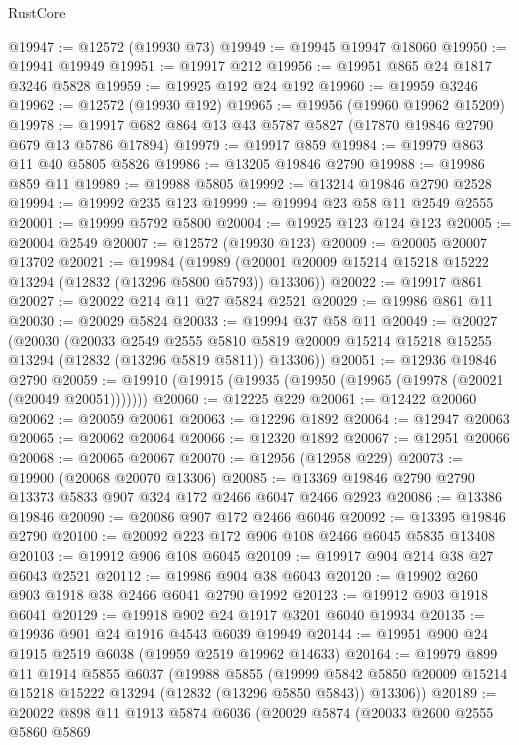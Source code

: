 \begin{lexlean}{RustCore}
\begin{coremodule}
@19947 := @12572 (@19930 @73)
@19949 := @19945 @19947 @18060
@19950 := @19941 @19949
@19951 := @19917 @212
@19956 := @19951 @865 @24 @1817 @3246 @5828
@19959 := @19925 @192 @24 @192
@19960 := @19959 @3246
@19962 := @12572 (@19930 @192)
@19965 := @19956 (@19960 @19962 @15209)
@19978 := @19917 @682 @864 @13 @43 @5787 @5827 (@17870 @19846 @2790 @679 @13 @5786 @17894)
@19979 := @19917 @859
@19984 := @19979 @863 @11 @40 @5805 @5826
@19986 := @13205 @19846 @2790
@19988 := @19986 @859 @11
@19989 := @19988 @5805
@19992 := @13214 @19846 @2790 @2528
@19994 := @19992 @235 @123
@19999 := @19994 @23 @58 @11 @2549 @2555
@20001 := @19999 @5792 @5800
@20004 := @19925 @123 @124 @123
@20005 := @20004 @2549
@20007 := @12572 (@19930 @123)
@20009 := @20005 @20007 @13702
@20021 := @19984
    (@19989 (@20001 @20009 @15214 @15218 @15222 @13294 (@12832 (@13296 @5800 @5793)) @13306))
@20022 := @19917 @861
@20027 := @20022 @214 @11 @27 @5824 @2521
@20029 := @19986 @861 @11
@20030 := @20029 @5824
@20033 := @19994 @37 @58 @11
@20049 := @20027
    (@20030
      (@20033
        @2549
        @2555
        @5810
        @5819
        @20009
        @15214
        @15218
        @15255
        @13294
        (@12832 (@13296 @5819 @5811))
        @13306))
@20051 := @12936 @19846 @2790
@20059 := @19910 (@19915 (@19935 (@19950 (@19965 (@19978 (@20021 (@20049 @20051)))))))
@20060 := @12225 @229
@20061 := @12422 @20060
@20062 := @20059 @20061
@20063 := @12296 @1892
@20064 := @12947 @20063
@20065 := @20062 @20064
@20066 := @12320 @1892
@20067 := @12951 @20066
@20068 := @20065 @20067
@20070 := @12956 (@12958 @229)
@20073 := @19900 (@20068 @20070 @13306)
@20085 := @13369 @19846 @2790 @2790 @13373 @5833 @907 @324 @172 @2466 @6047 @2466 @2923
@20086 := @13386 @19846
@20090 := @20086 @907 @172 @2466 @6046
@20092 := @13395 @19846 @2790
@20100 := @20092 @223 @172 @906 @108 @2466 @6045 @5835 @13408
@20103 := @19912 @906 @108 @6045
@20109 := @19917 @904 @214 @38 @27 @6043 @2521
@20112 := @19986 @904 @38 @6043
@20120 := @19902 @260 @903 @1918 @38 @2466 @6041 @2790 @1992
@20123 := @19912 @903 @1918 @6041
@20129 := @19918 @902 @24 @1917 @3201 @6040 @19934
@20135 := @19936 @901 @24 @1916 @4543 @6039 @19949
@20144 := @19951 @900 @24 @1915 @2519 @6038 (@19959 @2519 @19962 @14633)
@20164 := @19979
    @899
    @11
    @1914
    @5855
    @6037
    (@19988
      @5855
      (@19999 @5842 @5850 @20009 @15214 @15218 @15222 @13294 (@12832 (@13296 @5850 @5843)) @13306))
@20189 := @20022
    @898
    @11
    @1913
    @5874
    @6036
    (@20029
      @5874
      (@20033
        @2600
        @2555
        @5860
        @5869

\end{coremodule}
\end{lexlean}
